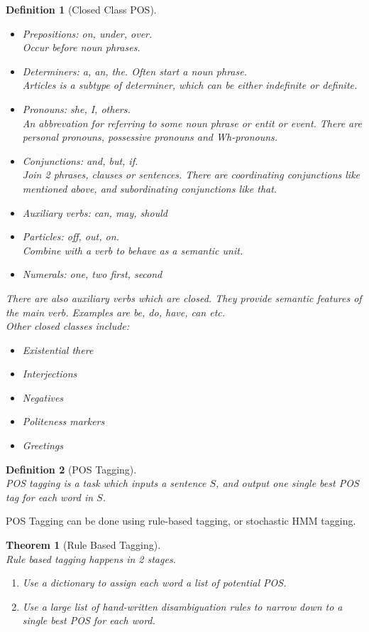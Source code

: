 \documentclass[12pt]{article}
\newtheorem{definition}{Definition}[section]
\newtheorem{theorem}{Theorem}[section]
\theoremstyle{definition}
\begin{document}
\begin{definition}[Closed Class POS]
\hfill\\\normalfont
\begin{itemize}
	\item Prepositions: on, under, over.\\ Occur before noun phrases.
	\item Determiners: a, an, the. Often start a noun phrase.\\ Articles is a subtype of determiner, which can be either indefinite or definite.
	\item Pronouns: she, I, others. \\ An abbrevation for referring to some noun phrase or entit or event. There are personal pronouns, possessive pronouns and Wh-pronouns.
	\item Conjunctions: and, but, if. \\ Join 2 phrases, clauses or sentences. There are coordinating conjunctions like mentioned above, and subordinating conjunctions like that.
	\item Auxiliary verbs: can, may, should
	\item Particles: off, out, on. \\ Combine with a verb to behave as a semantic unit.
	\item Numerals: one, two first, second
\end{itemize}
There are also auxiliary verbs which are closed. They provide semantic features of the main verb. Examples are be, do, have, can etc.\\
Other closed classes include:
\begin{itemize}
	\item Existential there
	\item Interjections
	\item Negatives
	\item Politeness markers
	\item Greetings
\end{itemize}
\end{definition}
\begin{definition}[POS Tagging]
\hfill\\\normalfont POS tagging is a task which inputs a sentence $S$, and output one single best POS tag for each word in $S$.
\end{definition}
POS Tagging can be done using rule-based tagging, or stochastic HMM tagging.
\begin{theorem}[Rule Based Tagging]
\hfill\\\normalfont Rule based tagging happens in 2 stages.
\begin{enumerate}
	\item Use a dictionary to assign each word a list of potential POS.
	\item Use a large list of hand-written disambiguation rules to narrow down to a single best POS for each word.
\end{enumerate}
\end{theorem}
\end{document}
